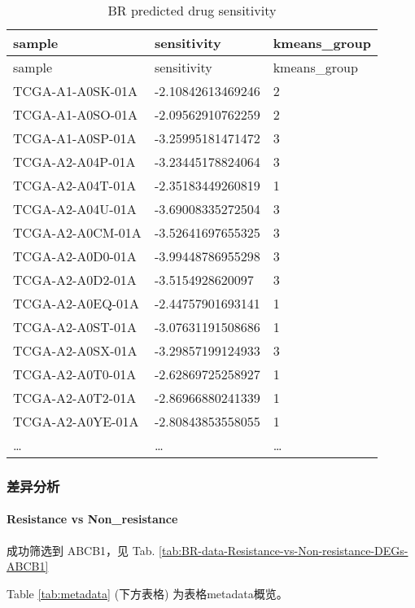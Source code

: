 \documentclass[
]{article}
\begin{document}
\begin{longtable}[]{@{}lll@{}}
\caption{\label{tab:BR-predicted-drug-sensitivity}BR predicted drug sensitivity}\tabularnewline
\toprule
sample & sensitivity & kmeans\_group\tabularnewline
\midrule
\endfirsthead
\toprule
sample & sensitivity & kmeans\_group\tabularnewline
\midrule
\endhead
TCGA-A1-A0SK-01A & -2.10842613469246 & 2\tabularnewline
TCGA-A1-A0SO-01A & -2.09562910762259 & 2\tabularnewline
TCGA-A1-A0SP-01A & -3.25995181471472 & 3\tabularnewline
TCGA-A2-A04P-01A & -3.23445178824064 & 3\tabularnewline
TCGA-A2-A04T-01A & -2.35183449260819 & 1\tabularnewline
TCGA-A2-A04U-01A & -3.69008335272504 & 3\tabularnewline
TCGA-A2-A0CM-01A & -3.52641697655325 & 3\tabularnewline
TCGA-A2-A0D0-01A & -3.99448786955298 & 3\tabularnewline
TCGA-A2-A0D2-01A & -3.5154928620097 & 3\tabularnewline
TCGA-A2-A0EQ-01A & -2.44757901693141 & 1\tabularnewline
TCGA-A2-A0ST-01A & -3.07631191508686 & 1\tabularnewline
TCGA-A2-A0SX-01A & -3.29857199124933 & 3\tabularnewline
TCGA-A2-A0T0-01A & -2.62869725258927 & 1\tabularnewline
TCGA-A2-A0T2-01A & -2.86966880241339 & 1\tabularnewline
TCGA-A2-A0YE-01A & -2.80843853558055 & 1\tabularnewline
\ldots{} & \ldots{} & \ldots{}\tabularnewline
\bottomrule
\end{longtable}

\begin{center}\vspace{1.5cm}\end{center}

\hypertarget{ux5deeux5f02ux5206ux6790}{%
\subsubsection{差异分析}\label{ux5deeux5f02ux5206ux6790}}

\hypertarget{resistance-vs-non_resistance}{%
\paragraph{Resistance vs Non\_resistance}\label{resistance-vs-non_resistance}}

成功筛选到 ABCB1，见 Tab. \ref{tab:BR-data-Resistance-vs-Non-resistance-DEGs-ABCB1}

\begin{center}\vspace{1.5cm}\end{center}

Table \ref{tab:metadata} (下方表格) 为表格metadata概览。
\end{document}
